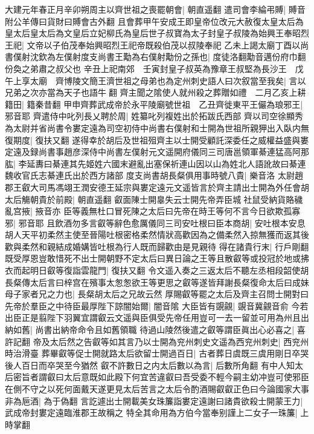 大建元年春正月辛卯朔周主以齊世祖之喪罷朝會|{
	朝直遥翻}
遣司會李綸弔賻|{
	賻音附公羊傳曰貨財曰賻會古外翻}
且會葬甲午安成王即皇帝位改元大赦復太皇太后為皇太后皇太后為文皇后立妃柳氏為皇后世子叔寶為太子封皇子叔陵為始興王奉昭烈王祀|{
	文帝以子伯茂奉始興昭烈王祀帝既殺伯茂以叔陵奉祀}
乙未上謁太廟丁酉以尚書僕射沈欽為左僕射度支尚書王勱為右僕射勱份之孫也|{
	度徒洛翻勱音邁份府巾翻份奐之弟肅之叔父也}
辛丑上祀南郊　壬寅封皇子叔英為豫章王叔堅為長沙王　戊午上享太廟　齊博陵文簡王濟世祖之母弟也為定州刺史語人曰次叙當至我矣|{
	言以兄弟之次亦當為天子也語牛翻}
齊主聞之隂使人就州殺之葬贈如禮　二月乙亥上耕籍田|{
	籍秦昔翻}
甲申齊葬武成帝於永平陵廟號世祖　乙丑齊徙東平王儼為琅邪王|{
	邪音耶}
齊遣侍中叱列長乂聘於周|{
	姓纂叱列複姓出於拓跋氏西部}
齊以司空徐顯秀為太尉并省尚書令婁定遠為司空初侍中尚書右僕射和士開為世祖所親狎出入臥内無復期度|{
	復扶又翻}
遂得幸於胡后及世祖殂齊主以士開受顧託深委任之威權益盛與婁定遠及録尚書事趙彦深侍中尚書左僕射元文遥開府儀同三司唐邕領軍綦連猛高阿那肱|{
	李延夀曰綦連其先姬姓六國末避亂出塞保祈連山因以山為姓北人語訛故曰綦連魏收官氏志綦連氏出於西方諸部}
度支尚書胡長粲俱用事時號八貴|{
	樂音洛}
太尉趙郡王叡大司馬馮翊王潤安德王延宗與婁定遠元文遥皆言於齊主請出士開為外任會胡太后觴朝貴於前殿|{
	朝直遥翻}
叡面陳士開辠失云士開先帝弄臣城社鼠受納貨賂穢亂宫掖|{
	掖音亦}
臣等義無杜口冒死陳之太后曰先帝在時王等何不言今日欲欺孤寡邪|{
	邪音耶}
且飲酒勿多言叡等辭色愈厲儀同三司安吐根曰臣本商胡|{
	安吐根本安息胡人天平初柔然主使至晉陽吐根密格柔然情狀高歡因為之備柔然入掠無獲而返其後歡與柔然和親結成婚媾皆吐根為行人既而歸歡由是見親待}
得在諸貴行末|{
	行戶剛翻}
既受厚恩豈敢惜死不出士開朝野不定太后曰異日論之王等且散叡等或投冠於地或拂衣而起明日叡等復詣雲龍門|{
	復扶又翻}
令文遥入奏之三返太后不聽左丞相段韶使胡長粲傳太后言曰梓宫在殯事太怱怱欲王等更思之叡等遂皆拜謝長粲復命太后曰成妹母子家者兄之力也|{
	長粲胡太后之兄故云然}
厚賜叡等罷之太后及齊主召問士開對曰先帝於羣臣之中待臣最厚陛下諒闇始爾|{
	闇音隂}
大臣皆有覬覦|{
	覬音冀覦音俞}
今若出臣正是翦陛下羽翼宜謂叡云文遥與臣俱受先帝任用豈可一去一留並可用為州且出納如舊|{
	尚書出納帝命令且如舊領職}
待過山陵然後遣之叡等謂臣眞出心必喜之|{
	喜許記翻}
帝及太后然之告叡等如其言乃以士開為兖州刺史文遥為西兖州刺史|{
	西兖州時治滑臺}
葬畢叡等促士開就路太后欲留士開過百日|{
	古者葬日虞既三虞用剛日卒哭後人百日而卒哭至今猶然}
叡不許數日之内太后數以為言|{
	后數所角翻}
有中人知太后密旨者謂叡曰太后意既如此殿下何宜苦違叡曰吾受委不輕今嗣主幼冲豈可使邪臣在側不守之以死何面戴天遂更見太后苦言之太后令酌酒賜叡叡正色曰今論國家大事非為巵酒|{
	為于偽翻}
言訖遽出士開載美女珠簾詣婁定遠謝曰諸貴欲殺士開蒙王力|{
	武成帝封婁定遠臨淮郡王故稱之}
特全其命用為方伯今當奉别謹上二女子一珠簾|{
	上時掌翻}
